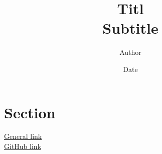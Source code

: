 \documentclass{article}
\begin{document}
\title{Titl\\
	\large Subtitle}
\author{Author}
\date{Date}
\maketitle
\hypersetup{linkcolor = internallinkcolor}
\tableofcontents
\hypersetup{linkcolor= .}

\section{Section}

\noindent\faGlobe\space\href{https://vitejs.dev/}{General link}\\
\noindent\faGithub\space\href{https://github.com/}{GitHub link}
\end{document}
